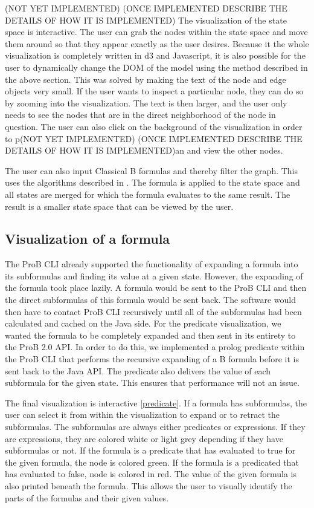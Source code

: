 (NOT YET IMPLEMENTED)
(ONCE IMPLEMENTED DESCRIBE THE DETAILS OF HOW IT IS IMPLEMENTED)
The visualization of the state space is interactive. The user can grab the nodes within the state space and move them around so that they appear exactly as the user desires. Because it the whole visualization is completely written in d3 and Javascript, it is also possible for the user to dynamically change the DOM of the model using the method described in the above section.  This was solved by making the text of the node and edge objects very small. If the user wants to inspect a particular node, they can do so by zooming into the visualization. The text is then larger, and the user only needs to see the nodes that are in the direct neighborhood of the node in question. The user can also click on the background of the visualization in order to p(NOT YET IMPLEMENTED)
(ONCE IMPLEMENTED DESCRIBE THE DETAILS OF HOW IT IS IMPLEMENTED)an and view the other nodes. 

The user can also input Classical B formulas and thereby filter the graph. This uses the algorithms described in \cite{LeTu05_8}. The formula is applied to the state space and all states are merged for which the formula evaluates to the same result. The result is a smaller state space that can be viewed by the user.

\subsection{Visualization of a formula}

The ProB CLI already supported the functionality of expanding a formula into its subformulas and finding its value at a given state. However, the expanding of the formula took place lazily. A formula would be sent to the ProB CLI and then the direct subformulas of this formula would be sent back. The software would then have to contact ProB CLI recursively until all of the subformulas had been calculated and cached on the Java side. For the predicate visualization, we wanted the formula to be completely expanded and then sent in its entirety to the ProB 2.0 API. In order to do this, we implemented a prolog predicate within the ProB CLI that performs the recursive expanding of a B formula before it is sent back to the Java API. The predicate also delivers the value of each subformula for the given state. This ensures that performance will not an issue. 

The final visualization is interactive \ref{predicate}. If a formula has subformulas, the user can select it from within the visualization to expand or to retract the subformulas. The subformulas are always either predicates or expressions. If they are expressions, they are colored white or light grey depending if they have subformulas or not. If the formula is a predicate that has evaluated to true for the given formula, the node is colored green. If the formula is a predicated that has evaluated to false, node is colored in red. The value of the given formula is also printed beneath the formula. This allows the user to visually identify the parts of the formulas and their given values. 

